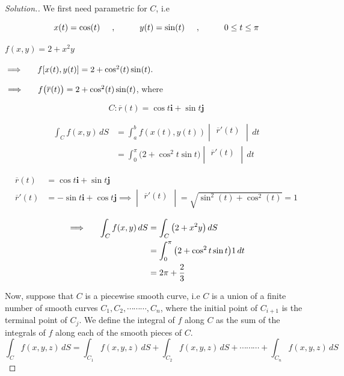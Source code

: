 \documentclass[11pt,a4paper]{article}
\theoremstyle{definition}
\newenvironment{solution}
  {\renewcommand{\qedsymbol}{}\begin{proof}[\textit{Solution}.]}
  {\end{proof}}
\begin{document}
\begin{solution}


We first need parametric for $C$, i.e 

$$x(t) = \cos (t)\hspace{0.5cm}, \hspace{1cm} y(t) = \sin (t)\hspace{0.5cm}, \hspace{1cm} 0\leq t \leq \pi$$

$f(x,y) = 2 + x^2 y$


$\implies \hspace{0.5cm} f[x(t),y(t)] = 2 + \cos ^2(t)\sin (t).$


$\implies\hspace{0.5cm} f\big(\overline{r}(t)\big) = 2 + \cos^2(t)\sin (t)$, where 

$$C: \overline{r}(t) = \cos t\textbf{i} + \sin t \textbf{j}$$

\begin{align*}
\int_C f(x,y)\,dS & = \int^b_af(x(t),y(t))\begin{vmatrix}
\overline{r}'(t)\\
\end{vmatrix}\,dt\\
& = \int^{\pi}_0 \big(2 + \cos^2t\sin t\big)\begin{vmatrix}
\overline{r}'(t)\\
\end{vmatrix}\,dt
\end{align*}

\begin{align*}
\overline{r}(t) & = \cos t \textbf{i} + \sin t \textbf{j}\\
\overline{r}'(t) & = -\sin t\textbf{i} + \cos t \textbf{j} \implies \begin{vmatrix}
\overline{r}'(t)\\
\end{vmatrix}= \sqrt{\sin^2 (t) + \cos^2(t)}=1
\end{align*}

\begin{align*}
\implies\hspace{0.5cm} \int_C f(x,y)\, dS & = \int_C \big(2 + x^2y\big)\, dS\\
& = \int^{\pi}_0\big(2 + \cos^2t\sin t\big) 1 \,dt\\
& = 2\pi + \frac{2}{3}\\
\end{align*}

Now, suppose that $C$ is a piecewise smooth curve, i.e $C$ is a union of a finite number of smooth curves $C_1,C_2,\cdots\cdots\cdots,C_n$, where the initial point of $C_{i+1}$ is the terminal point of $C_j$. We define the integral of $f$ along $C$ as the sum of the integrals of $f$ along each of the smooth pieces of $C$.
$$\int_C f(x,y,z)\,dS = \int_{C_1}f(x,y,z)\,dS + \int_{C_2}f(x,y,z)\,dS+\cdots\cdots\cdots + \int_{C_n}f(x,y,z)\,dS$$
\end{solution}
\end{document}
